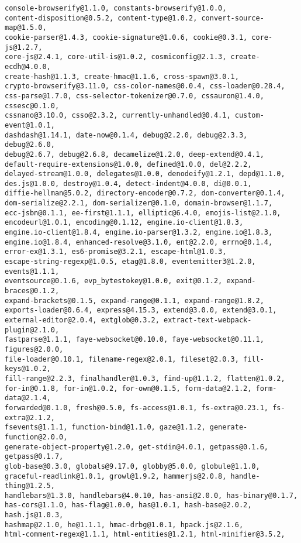 \documentclass[a4paper]{article}
\begin{document}
\begin{verbatim}
console-browserify@1.1.0, constants-browserify@1.0.0,
content-disposition@0.5.2, content-type@1.0.2, convert-source-map@1.5.0,
cookie-parser@1.4.3, cookie-signature@1.0.6, cookie@0.3.1, core-js@1.2.7,
core-js@2.4.1, core-util-is@1.0.2, cosmiconfig@2.1.3, create-ecdh@4.0.0,
create-hash@1.1.3, create-hmac@1.1.6, cross-spawn@3.0.1,
crypto-browserify@3.11.0, css-color-names@0.0.4, css-loader@0.28.4,
css-parse@1.7.0, css-selector-tokenizer@0.7.0, cssauron@1.4.0, cssesc@0.1.0,
cssnano@3.10.0, csso@2.3.2, currently-unhandled@0.4.1, custom-event@1.0.1,
dashdash@1.14.1, date-now@0.1.4, debug@2.2.0, debug@2.3.3, debug@2.6.0,
debug@2.6.7, debug@2.6.8, decamelize@1.2.0, deep-extend@0.4.1,
default-require-extensions@1.0.0, defined@1.0.0, del@2.2.2,
delayed-stream@1.0.0, delegates@1.0.0, denodeify@1.2.1, depd@1.1.0,
des.js@1.0.0, destroy@1.0.4, detect-indent@4.0.0, di@0.0.1,
diffie-hellman@5.0.2, directory-encoder@0.7.2, dom-converter@0.1.4,
dom-serialize@2.2.1, dom-serializer@0.1.0, domain-browser@1.1.7,
ecc-jsbn@0.1.1, ee-first@1.1.1, elliptic@6.4.0, emojis-list@2.1.0,
encodeurl@1.0.1, encoding@0.1.12, engine.io-client@1.8.3,
engine.io-client@1.8.4, engine.io-parser@1.3.2, engine.io@1.8.3,
engine.io@1.8.4, enhanced-resolve@3.1.0, ent@2.2.0, errno@0.1.4,
error-ex@1.3.1, es6-promise@3.2.1, escape-html@1.0.3,
escape-string-regexp@1.0.5, etag@1.8.0, eventemitter3@1.2.0, events@1.1.1,
eventsource@0.1.6, evp_bytestokey@1.0.0, exit@0.1.2, expand-braces@0.1.2,
expand-brackets@0.1.5, expand-range@0.1.1, expand-range@1.8.2,
exports-loader@0.6.4, express@4.15.3, extend@3.0.0, extend@3.0.1,
external-editor@2.0.4, extglob@0.3.2, extract-text-webpack-plugin@2.1.0,
fastparse@1.1.1, faye-websocket@0.10.0, faye-websocket@0.11.1, figures@2.0.0,
file-loader@0.10.1, filename-regex@2.0.1, fileset@2.0.3, fill-keys@1.0.2,
fill-range@2.2.3, finalhandler@1.0.3, find-up@1.1.2, flatten@1.0.2,
for-in@0.1.8, for-in@1.0.2, for-own@0.1.5, form-data@2.1.2, form-data@2.1.4,
forwarded@0.1.0, fresh@0.5.0, fs-access@1.0.1, fs-extra@0.23.1, fs-extra@2.1.2,
fsevents@1.1.1, function-bind@1.1.0, gaze@1.1.2, generate-function@2.0.0,
generate-object-property@1.2.0, get-stdin@4.0.1, getpass@0.1.6, getpass@0.1.7,
glob-base@0.3.0, globals@9.17.0, globby@5.0.0, globule@1.1.0,
graceful-readlink@1.0.1, growl@1.9.2, hammerjs@2.0.8, handle-thing@1.2.5,
handlebars@1.3.0, handlebars@4.0.10, has-ansi@2.0.0, has-binary@0.1.7,
has-cors@1.1.0, has-flag@1.0.0, has@1.0.1, hash-base@2.0.2, hash.js@1.0.3,
hashmap@2.1.0, he@1.1.1, hmac-drbg@1.0.1, hpack.js@2.1.6,
html-comment-regex@1.1.1, html-entities@1.2.1, html-minifier@3.5.2,

\end{verbatim}
\end{document}
